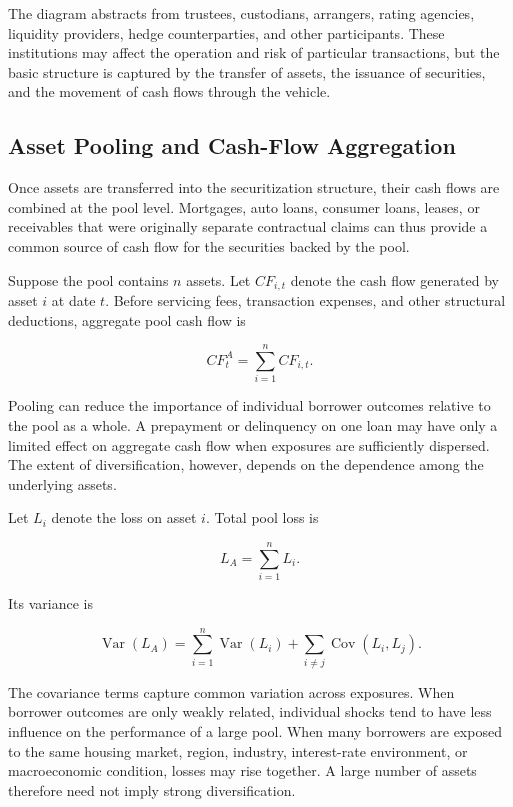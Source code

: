 The diagram abstracts from trustees, custodians, arrangers, rating agencies, liquidity providers, hedge counterparties, and other participants. These institutions may affect the operation and risk of particular transactions, but the basic structure is captured by the transfer of assets, the issuance of securities, and the movement of cash flows through the vehicle.


\subsection{Asset Pooling and Cash-Flow Aggregation}

Once assets are transferred into the securitization structure, their cash flows are combined at the pool level. Mortgages, auto loans, consumer loans, leases, or receivables that were originally separate contractual claims can thus provide a common source of cash flow for the securities backed by the pool.

Suppose the pool contains \(n\) assets. Let \(CF_{i,t}\) denote the cash flow generated by asset \(i\) at date \(t\). Before servicing fees, transaction expenses, and other structural deductions, aggregate pool cash flow is

\begin{equation}
CF_t^{A}
=
\sum_{i=1}^{n} CF_{i,t}.
\label{eq:ch20-pool-cash-flow}
\end{equation}

Pooling can reduce the importance of individual borrower outcomes relative to the pool as a whole. A prepayment or delinquency on one loan may have only a limited effect on aggregate cash flow when exposures are sufficiently dispersed. The extent of diversification, however, depends on the dependence among the underlying assets.

Let \(L_i\) denote the loss on asset \(i\). Total pool loss is

\begin{equation}
L_A
=
\sum_{i=1}^{n} L_i.
\label{eq:ch20-pool-loss}
\end{equation}

Its variance is

\begin{equation}
\operatorname{Var}(L_A)
=
\sum_{i=1}^{n}\operatorname{Var}(L_i)
+
\sum_{i\neq j}\operatorname{Cov}(L_i,L_j).
\label{eq:ch20-pool-loss-variance}
\end{equation}

The covariance terms capture common variation across exposures. When borrower outcomes are only weakly related, individual shocks tend to have less influence on the performance of a large pool. When many borrowers are exposed to the same housing market, region, industry, interest-rate environment, or macroeconomic condition, losses may rise together. A large number of assets therefore need not imply strong diversification.

